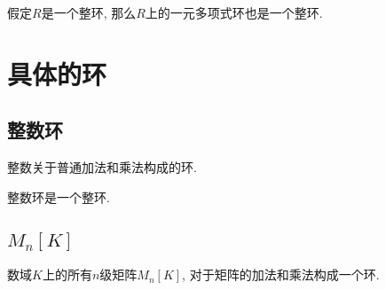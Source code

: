 \begin{Proposition}
假定$R$是一个整环, 那么$R$上的一元多项式环也是一个整环.
\end{Proposition}

\section{具体的环}

\subsection{整数环} %

\begin{Definition}[整数环]
整数关于普通加法和乘法构成的环.
\end{Definition}

\begin{Proposition}
整数环是一个整环.
\end{Proposition}

\subsection{$M_n[K]$}

\begin{Note}
数域$K$上的所有$n$级矩阵$M_n[K]$, 对于矩阵的加法和乘法构成一个环.
\end{Note}